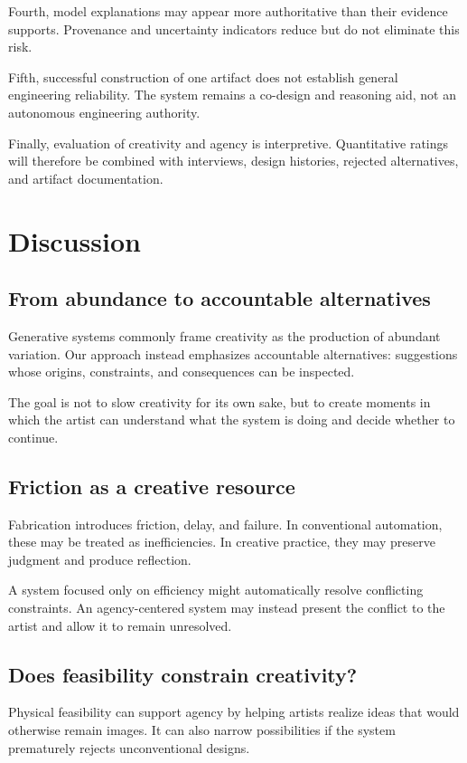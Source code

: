 \documentclass{article}
\begin{document}
Fourth, model explanations may appear more authoritative than their evidence
supports. Provenance and uncertainty indicators reduce but do not eliminate
this risk.

Fifth, successful construction of one artifact does not establish general
engineering reliability. The system remains a co-design and reasoning aid, not
an autonomous engineering authority.

Finally, evaluation of creativity and agency is interpretive. Quantitative
ratings will therefore be combined with interviews, design histories, rejected
alternatives, and artifact documentation.

\section{Discussion}

\subsection{From abundance to accountable alternatives}

Generative systems commonly frame creativity as the production of abundant
variation. Our approach instead emphasizes accountable alternatives:
suggestions whose origins, constraints, and consequences can be inspected.

The goal is not to slow creativity for its own sake, but to create moments in
which the artist can understand what the system is doing and decide whether to
continue.

\subsection{Friction as a creative resource}

Fabrication introduces friction, delay, and failure. In conventional automation,
these may be treated as inefficiencies. In creative practice, they may preserve
judgment and produce reflection.

A system focused only on efficiency might automatically resolve conflicting
constraints. An agency-centered system may instead present the conflict to the
artist and allow it to remain unresolved.

\subsection{Does feasibility constrain creativity?}

Physical feasibility can support agency by helping artists realize ideas that
would otherwise remain images. It can also narrow possibilities if the system
prematurely rejects unconventional designs.
\end{document}
